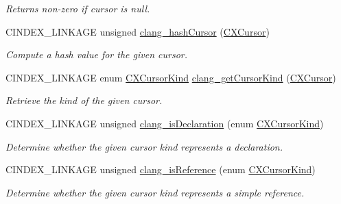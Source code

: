 \begin{DoxyCompactItemize}
\begin{DoxyCompactList}\small\item\em Returns non-\/zero if {\ttfamily cursor} is null. \end{DoxyCompactList}\item 
\mbox{\label{group__CINDEX__CURSOR__MANIP_gabf27e0eaee38ae9e7453f55754d4929b}} 
C\+I\+N\+D\+E\+X\+\_\+\+L\+I\+N\+K\+A\+GE unsigned \mbox{\hyperlink{group__CINDEX__CURSOR__MANIP_gabf27e0eaee38ae9e7453f55754d4929b}{clang\+\_\+hash\+Cursor}} (\mbox{\hyperlink{structCXCursor}{C\+X\+Cursor}})
\begin{DoxyCompactList}\small\item\em Compute a hash value for the given cursor. \end{DoxyCompactList}\item 
\mbox{\label{group__CINDEX__CURSOR__MANIP_ga018aaf60362cb751e517d9f8620d490c}} 
C\+I\+N\+D\+E\+X\+\_\+\+L\+I\+N\+K\+A\+GE enum \mbox{\hyperlink{group__CINDEX_gaaccc432245b4cd9f2d470913f9ef0013}{C\+X\+Cursor\+Kind}} \mbox{\hyperlink{group__CINDEX__CURSOR__MANIP_ga018aaf60362cb751e517d9f8620d490c}{clang\+\_\+get\+Cursor\+Kind}} (\mbox{\hyperlink{structCXCursor}{C\+X\+Cursor}})
\begin{DoxyCompactList}\small\item\em Retrieve the kind of the given cursor. \end{DoxyCompactList}\item 
\mbox{\label{group__CINDEX__CURSOR__MANIP_ga660aa4846fce0a54e20073ab6a5465a0}} 
C\+I\+N\+D\+E\+X\+\_\+\+L\+I\+N\+K\+A\+GE unsigned \mbox{\hyperlink{group__CINDEX__CURSOR__MANIP_ga660aa4846fce0a54e20073ab6a5465a0}{clang\+\_\+is\+Declaration}} (enum \mbox{\hyperlink{group__CINDEX_gaaccc432245b4cd9f2d470913f9ef0013}{C\+X\+Cursor\+Kind}})
\begin{DoxyCompactList}\small\item\em Determine whether the given cursor kind represents a declaration. \end{DoxyCompactList}\item 
C\+I\+N\+D\+E\+X\+\_\+\+L\+I\+N\+K\+A\+GE unsigned \mbox{\hyperlink{group__CINDEX__CURSOR__MANIP_gaf1bf500b9ada62671b53831d023387ba}{clang\+\_\+is\+Reference}} (enum \mbox{\hyperlink{group__CINDEX_gaaccc432245b4cd9f2d470913f9ef0013}{C\+X\+Cursor\+Kind}})
\begin{DoxyCompactList}\small\item\em Determine whether the given cursor kind represents a simple reference. \end{DoxyCompactList}\item 

\end{DoxyCompactItemize}
